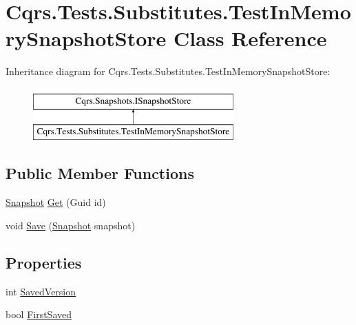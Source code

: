 \hypertarget{classCqrs_1_1Tests_1_1Substitutes_1_1TestInMemorySnapshotStore}{}\section{Cqrs.\+Tests.\+Substitutes.\+Test\+In\+Memory\+Snapshot\+Store Class Reference}
\label{classCqrs_1_1Tests_1_1Substitutes_1_1TestInMemorySnapshotStore}
Inheritance diagram for Cqrs.\+Tests.\+Substitutes.\+Test\+In\+Memory\+Snapshot\+Store\+:\begin{figure}[H]
\begin{center}
\leavevmode
\includegraphics[height=2.000000cm]{classCqrs_1_1Tests_1_1Substitutes_1_1TestInMemorySnapshotStore}
\end{center}
\end{figure}
\subsection*{Public Member Functions}
\begin{DoxyCompactItemize}
\item 
\hyperlink{classCqrs_1_1Snapshots_1_1Snapshot}{Snapshot} \hyperlink{classCqrs_1_1Tests_1_1Substitutes_1_1TestInMemorySnapshotStore_a4e149196381a80cc9c53cdbb67b8dcaa}{Get} (Guid id)
\item 
void \hyperlink{classCqrs_1_1Tests_1_1Substitutes_1_1TestInMemorySnapshotStore_afec5ba3ed2b39625b3ccfb002d1c935e}{Save} (\hyperlink{classCqrs_1_1Snapshots_1_1Snapshot}{Snapshot} snapshot)
\end{DoxyCompactItemize}
\subsection*{Properties}
\begin{DoxyCompactItemize}
\item 
int \hyperlink{classCqrs_1_1Tests_1_1Substitutes_1_1TestInMemorySnapshotStore_a9924a25c49a5aca8fa2f29ca84ad0d11}{Saved\+Version}
\item 
bool \hyperlink{classCqrs_1_1Tests_1_1Substitutes_1_1TestInMemorySnapshotStore_a8e78ba4aad268910f35df0eb083d9883}{First\+Saved}
\end{DoxyCompactItemize}


